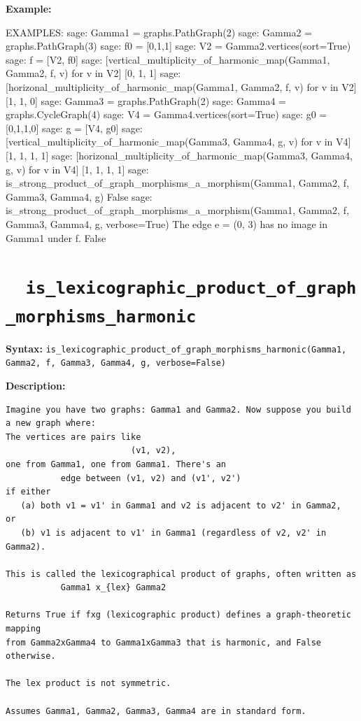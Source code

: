 \documentclass{article}
\begin{document}
\textbf{Example:}
\begin{spverbatim}
EXAMPLES:
    sage: Gamma1 = graphs.PathGraph(2)
    sage: Gamma2 = graphs.PathGraph(3)
    sage: f0 = [0,1,1]       
    sage: V2 = Gamma2.vertices(sort=True) 
    sage: f = [V2, f0]     
    sage: [vertical_multiplicity_of_harmonic_map(Gamma1, Gamma2, f, v) for v in V2] 
    [0, 1, 1]
    sage: [horizonal_multiplicity_of_harmonic_map(Gamma1, Gamma2, f, v) for v in V2]
    [1, 1, 0]
    sage: Gamma3 = graphs.PathGraph(2) 
    sage: Gamma4 = graphs.CycleGraph(4) 
    sage: V4 = Gamma4.vertices(sort=True) 
    sage: g0 = [0,1,1,0]     
    sage: g = [V4, g0]  
    sage: [vertical_multiplicity_of_harmonic_map(Gamma3, Gamma4, g, v) for v in V4] 
    [1, 1, 1, 1]
    sage: [horizonal_multiplicity_of_harmonic_map(Gamma3, Gamma4, g, v) for v in V4]  
    [1, 1, 1, 1]
    sage: is_strong_product_of_graph_morphisms_a_morphism(Gamma1, Gamma2, f, Gamma3, Gamma4, g) 
    False
    sage: is_strong_product_of_graph_morphisms_a_morphism(Gamma1, Gamma2, f, Gamma3, Gamma4, g, verbose=True)
    The edge e =  (0, 3)  has no image in Gamma1 under f.
    False
\end{spverbatim}

\section{\tt \ \ is\_lexicographic\_product\_of\_graph\_morphisms\_harmonic}

\textbf{Syntax:}
{\small{
\verb}is_lexicographic_product_of_graph_morphisms_harmonic(Gamma1, Gamma2, f, Gamma3, Gamma4, g, verbose=False)}
}}

\textbf{Description:}
\begin{verbatim}
Imagine you have two graphs: Gamma1 and Gamma2. Now suppose you build a new graph where:
The vertices are pairs like 
                         (v1, v2),
one from Gamma1, one from Gamma1. There's an 
           edge between (v1, v2) and (v1', v2') 
if either 
   (a) both v1 = v1' in Gamma1 and v2 is adjacent to v2' in Gamma2,
or
   (b) v1 is adjacent to v1' in Gamma1 (regardless of v2, v2' in Gamma2).

This is called the lexicographical product of graphs, often written as 
           Gamma1 x_{lex} Gamma2

Returns True if fxg (lexicographic product) defines a graph-theoretic mapping
from Gamma2xGamma4 to Gamma1xGamma3 that is harmonic, and False otherwise. 

The lex product is not symmetric.

Assumes Gamma1, Gamma2, Gamma3, Gamma4 are in standard form.
\end{verbatim}
\end{document}
